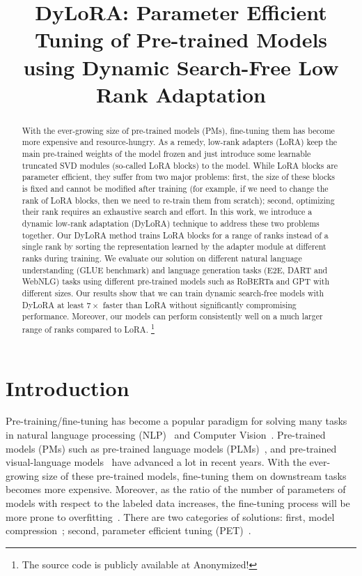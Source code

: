 \title{DyLoRA: Parameter Efficient Tuning of Pre-trained Models using Dynamic Search-Free Low Rank Adaptation}

\begin{abstract}
With the ever-growing size of pre-trained models (PMs), fine-tuning them has become more expensive and resource-hungry. As a remedy, low-rank adapters (LoRA) keep the main pre-trained weights of the model frozen and just introduce some learnable truncated SVD modules (so-called LoRA blocks) to the model. While LoRA blocks are parameter efficient, they suffer from two major problems: first, the size of these blocks is fixed and cannot be modified after training (for example, if we need to change the rank of LoRA blocks, then we need to re-train them from scratch); second, optimizing their rank requires an exhaustive search and effort. In this work, we introduce a dynamic low-rank adaptation (DyLoRA) technique to address these two problems together. Our DyLoRA method trains LoRA blocks for a range of ranks instead of a single rank by sorting the representation learned by the adapter module at different ranks during training. We evaluate our solution on different natural language understanding (GLUE benchmark) and language generation tasks (E2E, DART and WebNLG) tasks using different pre-trained models such as RoBERTa and GPT with different sizes. Our results show that we can train dynamic search-free models with DyLoRA at least $7\times$ faster than LoRA without significantly compromising performance. Moreover, our models can perform consistently well on a much larger range of ranks compared to LoRA.
 \footnote{The source code is publicly available at Anonymized!

 }
\end{abstract}

\section{Introduction}

Pre-training/fine-tuning has become a popular paradigm for solving many tasks in natural language processing (NLP)~\cite{devlin2018bert,liu2019roberta,brown2020language} and Computer Vision~\cite{simonyan2014very, he2016deep, howard2019searching, bochkovskiy2020yolov4, chen2020generative, dosovitskiy2020image}. Pre-trained models (PMs) such as pre-trained language models (PLMs)~\cite{devlin2018bert, brown2020language},  and pre-trained visual-language models~\cite{lu2019vilbert, li2019visualbert, su2019vl, xia2021xgpt} have advanced a lot in recent years. With the ever-growing size of these pre-trained models, fine-tuning them on downstream tasks becomes more expensive. Moreover, as the ratio of the number of parameters of models with respect to the labeled data increases, the fine-tuning process will be more prone to overfitting~\cite{karimi2021compacter}. There are two categories of solutions: first, model compression~\cite{jafari2021annealing, chen2021drone}; second, parameter efficient tuning (PET)~\cite{houlsby2019parameter, karimi2021compacter, mao2021unipelt}. 

